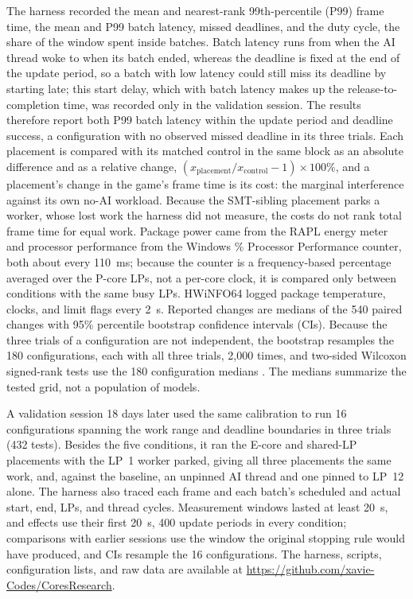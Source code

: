 \documentclass[conference]{IEEEtran}
\begin{document}
The harness recorded the mean and nearest-rank 99th-percentile (P99) frame time, the mean and P99 batch latency, missed deadlines, and the duty cycle, the share of the window spent inside batches. Batch latency runs from when the AI thread woke to when its batch ended, whereas the deadline is fixed at the end of the update period, so a batch with low latency could still miss its deadline by starting late; this start delay, which with batch latency makes up the release-to-completion time, was recorded only in the validation session. The results therefore report both P99 batch latency within the update period and deadline success, a configuration with no observed missed deadline in its three trials. Each placement is compared with its matched control in the same block as an absolute difference and as a relative change, $(x_{\mathrm{placement}}/x_{\mathrm{control}}-1)\times100\%$, and a placement's change in the game's frame time is its cost: the marginal interference against its own no-AI workload. Because the SMT-sibling placement parks a worker, whose lost work the harness did not measure, the costs do not rank total frame time for equal work. Package power came from the RAPL energy meter \cite{khan} and processor performance from the Windows \% Processor Performance counter, both about every 110~ms; because the counter is a frequency-based percentage averaged over the P-core LPs, not a per-core clock, it is compared only between conditions with the same busy LPs. HWiNFO64 logged package temperature, clocks, and limit flags every 2~s. Reported changes are medians of the 540 paired changes with 95\% percentile bootstrap confidence intervals (CIs). Because the three trials of a configuration are not independent, the bootstrap resamples the 180 configurations, each with all three trials, 2,000 times, and two-sided Wilcoxon signed-rank tests use the 180 configuration medians \cite{wilcoxon}. The medians summarize the tested grid, not a population of models.

A validation session 18 days later used the same calibration to run 16 configurations spanning the work range and deadline boundaries in three trials (432 tests). Besides the five conditions, it ran the E-core and shared-LP placements with the LP~1 worker parked, giving all three placements the same work, and, against the baseline, an unpinned AI thread and one pinned to LP~12 alone. The harness also traced each frame and each batch's scheduled and actual start, end, LPs, and thread cycles. Measurement windows lasted at least 20~s, and effects use their first 20~s, 400 update periods in every condition; comparisons with earlier sessions use the window the original stopping rule would have produced, and CIs resample the 16 configurations. The harness, scripts, configuration lists, and raw data are available at \url{https://github.com/xavie-Codes/CoresResearch}.
\end{document}
